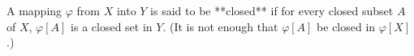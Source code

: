 A mapping $\varphi$ from $X$ into $Y$ is said to be **closed** if for every closed subset $A$ of $X$, $\varphi[A]$ is a closed set in $Y$. (It is not enough that $\varphi[A]$ be closed in $\varphi[X]$.)
